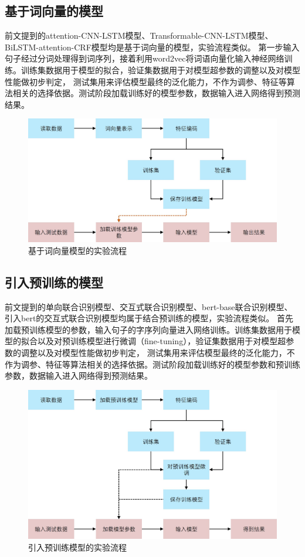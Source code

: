 \subsection{基于词向量的模型}
前文提到的attention-CNN-LSTM模型、Transformable-CNN-LSTM模型、BiLSTM-attention-CRF模型均是基于词向量的模型，实验流程类似。
第一步输入句子经过分词处理得到词序列，接着利用word2vec将词语向量化输入神经网络训练。训练集数据用于模型的拟合，验证集数据用于对模型超参数的调整以及对模型性能做初步判定，
测试集用来评估模型最终的泛化能力，不作为调参、特征等算法相关的选择依据。测试阶段加载训练好的模型参数，数据输入进入网络得到预测结果。
\begin{figure}[htbp]
  \centering
  \includegraphics[scale=0.4]{./images/word2vecTrain.jpg}
  \caption{基于词向量模型的实验流程}
  \label{fig:word2vecTrain}
\end{figure}

\subsection{引入预训练的模型}
前文提到的单向联合识别模型、交互式联合识别模型、bert-base联合识别模型、引入bert的交互式联合识别模型均属于结合预训练的模型，实验流程类似。
首先加载预训练模型的参数，输入句子的字序列向量进入网络训练。训练集数据用于模型的拟合以及对预训练模型进行微调（fine-tuning），验证集数据用于对模型超参数的调整以及对模型性能做初步判定，
测试集用来评估模型最终的泛化能力，不作为调参、特征等算法相关的选择依据。测试阶段加载训练好的模型参数和预训练参数，数据输入进入网络得到预测结果。
\begin{figure}[htbp]
  \centering
  \includegraphics[scale=0.4]{./images/bertTrain.jpg}
  \caption{引入预训练模型的实验流程}
  \label{fig:bertTrain}
\end{figure}


